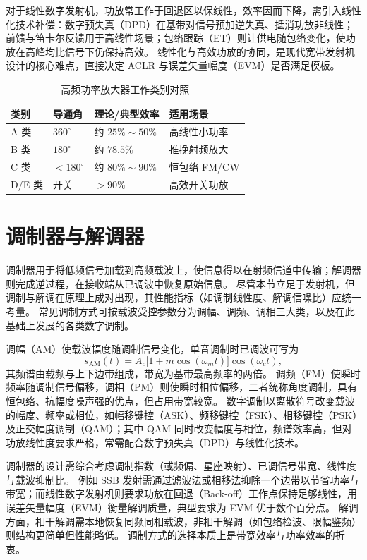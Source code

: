 对于线性数字发射机，功放常工作于回退区以保线性，效率因而下降，需引入线性化技术补偿：数字预失真（DPD）在基带对信号预加逆失真、抵消功放非线性；前馈与笛卡尔反馈用于高线性场景；包络跟踪（ET）则让供电随包络变化，使功放在高峰均比信号下仍保持高效。
线性化与高效功放的协同，是现代宽带发射机设计的核心难点，直接决定 ACLR 与误差矢量幅度（EVM）是否满足模板。

\begin{table}[htbp]
\centering
\caption{高频功率放大器工作类别对照}
\label{tab:pa_classes}
\begin{tabular}{|p{2.2cm}|p{3cm}|p{3.6cm}|p{4cm}|}
\hline
\textbf{类别} & \textbf{导通角} & \textbf{理论/典型效率} & \textbf{适用场景} \\
\hline
A 类 & $360^\circ$ & 约 $25\%\sim 50\%$ & 高线性小功率 \\
\hline
B 类 & $180^\circ$ & 约 $78.5\%$ & 推挽射频放大 \\
\hline
C 类 & $<180^\circ$ & 约 $80\%\sim 90\%$ & 恒包络 FM/CW \\
\hline
D/E 类 & 开关 & $>90\%$ & 高效开关功放 \\
\hline
\end{tabular}
\end{table}

\section{调制器与解调器}
\label{sec:modulator_demodulator}

调制器用于将低频信号加载到高频载波上，使信息得以在射频信道中传输；解调器则完成逆过程，在接收端从已调波中恢复原始信息。
尽管本节立足于发射机，但调制与解调在原理上成对出现，其性能指标（如调制线性度、解调信噪比）应统一考量。
常见调制方式可按载波受控参数分为调幅、调频、调相三大类，以及在此基础上发展的各类数字调制。

调幅（AM）使载波幅度随调制信号变化，单音调制时已调波可写为
\begin{equation}
s_{\mathrm{AM}}(t)=A_c\bigl[1+m\cos(\omega_m t)\bigr]\cos(\omega_c t),
\end{equation}
其频谱由载频与上下边带组成，带宽为基带最高频率的两倍。
调频（FM）使瞬时频率随调制信号偏移，调相（PM）则使瞬时相位偏移，二者统称角度调制，具有恒包络、抗幅度噪声强的优点，但占用带宽较宽。
数字调制以离散符号改变载波的幅度、频率或相位，如幅移键控（ASK）、频移键控（FSK）、相移键控（PSK）及正交幅度调制（QAM）；其中 QAM 同时改变幅度与相位，频谱效率高，但对功放线性度要求严格，常需配合数字预失真（DPD）与线性化技术。

调制器的设计需综合考虑调制指数（或频偏、星座映射）、已调信号带宽、线性度与载波抑制比。
例如 SSB 发射需通过滤波法或相移法抑除一个边带以节省功率与带宽；而线性数字发射机则要求功放在回退（Back-off）工作点保持足够线性，用误差矢量幅度（EVM）衡量解调质量，典型要求为 EVM 优于数个百分点。
解调方面，相干解调需本地恢复同频同相载波，非相干解调（如包络检波、限幅鉴频）则结构更简单但性能略低。
调制方式的选择本质上是带宽效率与功率效率的折衷。

